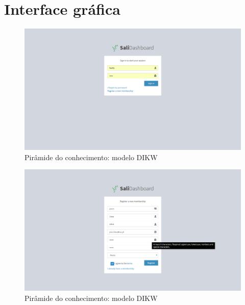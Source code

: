 \chapter{Interface gráfica}


\begin{figure}[h]
	\centering
	\includegraphics[width=\linewidth]{prints-web/login.png}
	\caption{Pirâmide do conhecimento: modelo DIKW}
	\label{dikw}
\end{figure}


\begin{figure}[h]
	\centering
	\includegraphics[width=\linewidth]{prints-web/register.png}
	\caption{Pirâmide do conhecimento: modelo DIKW}
	\label{dikw}
\end{figure}
